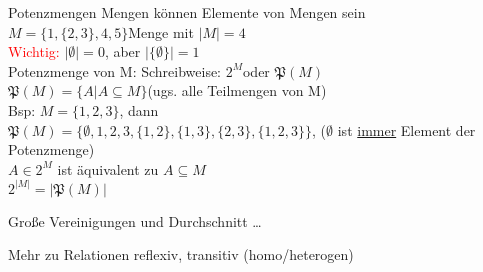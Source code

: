 \begin{frame}{Potenzmengen}
 Mengen können Elemente von Mengen sein\\
 $M = \{1, \{2, 3\}, 4, 5\} $Menge mit $\lvert M\rvert = 4$\\
 \textcolor{red}{Wichtig:} $\lvert \emptyset\rvert = 0$, aber $\lvert\{\emptyset\}\rvert = 1$\\
 Potenzmenge von M: Schreibweise: $2^M $oder $\mathfrak{P}(M)$\\
 $\mathfrak{P}(M) = \{ A\vert A\subseteq M\}$(ugs. alle Teilmengen von M)\\
 Bsp: $M = \{1, 2, 3\}$, dann\\
 $\mathfrak{P}(M) =\{\emptyset ,1, 2, 3, \{1, 2\}, \{1, 3\}, \{2, 3\}, \{1,2,3\}\}$, ($\emptyset$ ist \underline{immer} Element der Potenzmenge)\\
 $A\in 2^M$ ist äquivalent zu $A\subseteq M$\\
 $2^{\lvert M\rvert} = \lvert\mathfrak{P}(M)\rvert$
\end{frame}

\begin{frame}{Große Vereinigungen und Durchschnitt}
 \dots%
\end{frame}

\begin{frame}{Mehr zu Relationen}
 reflexiv, transitiv (homo/heterogen)
\end{frame}

